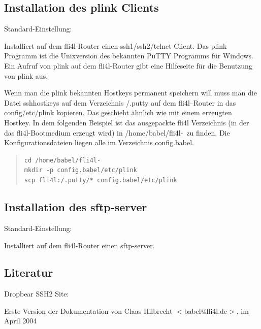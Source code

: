 \subsection {Installation des plink Clients}

\begin{description}


  Standard-Einstellung: 

  Installiert auf dem fli4l-Router einen ssh1/ssh2/telnet Client. Das
  plink Programm ist die Unixversion des bekannten PuTTY Programms für
  Windows. Ein Aufruf von plink auf dem fli4l-Router gibt eine
  Hilfeseite für die Benutzung von plink aus.

  Wenn man die plink bekannten Hostkeys permanent speichern will muss
  man die Datei sshhostkeys auf dem Verzeichnis /.putty auf dem
  fli4l--Router in das config/etc/plink kopieren. Das geschieht
  ähnlich wie mit einem erzeugten Hostkey. In dem folgenden Beispiel
  ist das ausgepackte fli4l Verzeichnis (in der das fli4l-Bootmedium 
  erzeugt wird) in /home/babel/fli4l-\version~zu finden. Die
  Konfigurationsdateien liegen alle im Verzeichnis config.babel.

\begin{example}
\begin{verse}
\texttt{cd /home/babel/fli4l-\version}\\
\texttt{mkdir -p config.babel/etc/plink}\\
\texttt{scp fli4l:/.putty/* config.babel/etc/plink}
\end{verse}
\end{example}

\end{description}

\subsection {Installation des sftp-server}

\begin{description}


  Standard-Einstellung: 

  Installiert auf dem fli4l-Router einen sftp-server. 

\end{description}

\subsection{Literatur}
Dropbear SSH2 Site: 

Erste Version der Dokumentation von
Claas Hilbrecht $<$babel@fli4l.de$>$, im April 2004
